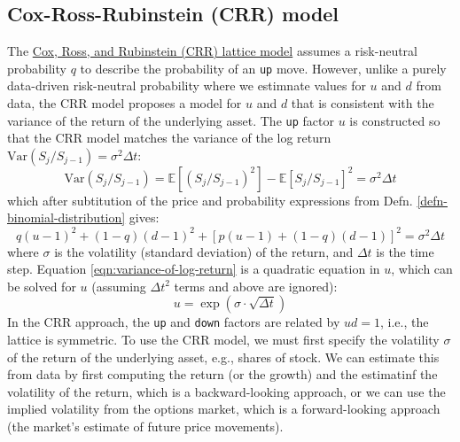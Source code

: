 \documentclass[11pt]{article}
\theoremstyle{definition}
\begin{document}
\subsection{Cox-Ross-Rubinstein (CRR) model}
The \href{https://en.wikipedia.org/wiki/Binomial_options_pricing_model}{Cox, Ross, and Rubinstein (CRR) lattice model} 
assumes a risk-neutral probability $q$ to describe the probability of an \texttt{up} move. However, unlike a purely data-driven risk-neutral probability where we estimnate 
values for $u$ and $d$ from data, the CRR model proposes a model for $u$ and $d$ that is consistent with the variance of the return of the underlying asset.
The \texttt{up} factor $u$ is constructed so that the CRR model matches the variance of the log return $\text{Var}(S_{j}/S_{j-1})=\sigma^{2}\Delta{t}$:
\begin{equation*}
	\text{Var}(S_{j}/S_{j-1}) = \mathbb{E}\left[(S_{j}/S_{j-1})^{2}\right] - \mathbb{E}\left[S_{j}/S_{j-1}\right]^{2} = \sigma^{2}\Delta{t}
\end{equation*}
which after subtitution of the price and probability expressions from Defn. \ref{defn-binomial-distribution} gives:
\begin{equation}\label{eqn:variance-of-log-return}
    q(u-1)^{2} + (1-q)(d-1)^{2} + \left[p(u-1)+(1-q)(d-1)\right]^{2} = \sigma^{2}\Delta{t}
\end{equation}
where $\sigma$ is the volatility (standard deviation) of the return, and $\Delta{t}$ is the time step.
Equation \eqref{eqn:variance-of-log-return} is a quadratic equation in $u$, which can be solved for $u$ (assuming $\Delta{t}^{2}$ terms and above are ignored):
\begin{equation*}
    u = \exp(\sigma\cdot\sqrt{\Delta{t}})
\end{equation*} 
In the CRR approach, the \texttt{up} and \texttt{down} factors are related by $ud=1$, i.e., the lattice is symmetric.
To use the CRR model, we must first specify the volatility $\sigma$ of the return of the underlying asset, e.g., shares of stock.
We can estimate this from data by first computing the return (or the growth) and the estimatinf the volatility of the return, which is a backward-looking approach, 
or we can use the implied volatility from the options market, which is a forward-looking approach (the market's estimate of future price movements).
\end{document}
